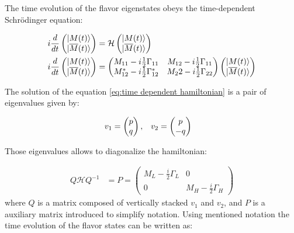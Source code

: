 The time evolution of the flavor eigenstates obeys the time-dependent Schr\"{o}dinger equation:

\begin{align}
\label{eq:time dependent hamiltonian}
\centering
    i\frac{d}{dt} \left(\begin{matrix} \ket{M(t)}  \\ \ket{\overline{M}(t)} \end{matrix}  \right) 
    &= \mathcal{H} \left(\begin{matrix} \ket{M(t)}  \\ \ket{\overline{M}(t)} \end{matrix}  \right) \\
    i\frac{d}{dt} \left(\begin{matrix} \ket{M(t)}  \\ \ket{\overline{M}(t)} \end{matrix}  \right) 
    &=\left( \begin{matrix} M_{11} - i\frac{1}{2}\Gamma_{11} & M_{12} -i\frac{1}{2}\Gamma_{11} \\ M_{12}^{*} - i\frac{1}{2}\Gamma_{12}^{*} & M_22-i\frac{1}{2}\Gamma_{22} \end{matrix} \right) \left(\begin{matrix} \ket{M(t)}  \\ \ket{\overline{M}(t)} \end{matrix}  \right) 
\end{align}

The solution of the equation \ref{eq:time dependent hamiltonian} is a pair of eigenvalues given by:

\begin{align}
\centering
    v_{1} &= \left( \begin{matrix} p  \\ q \end{matrix} \right), & 
    v_{2} &=  \left( \begin{matrix} p \\ -q \end{matrix} \right) 
\end{align}

Those eigenvalues allows to diagonalize the hamiltonian: 

\begin{align}
   Q\mathcal{H}Q^{-1} &= P =  \left( \begin{matrix} M_{L} - \frac{i}{2}\Gamma_{L} & 0  \\ 0 &  M_{H} - \frac{i}{2}\Gamma_{H}  \end{matrix} \right) 
\end{align}
where $Q$ is a matrix composed of vertically stacked $v_1$ and $v_2$, and $P$ is a auxiliary matrix introduced to simplify notation. 
Using mentioned notation the time evolution of the flavor states can be written as:

